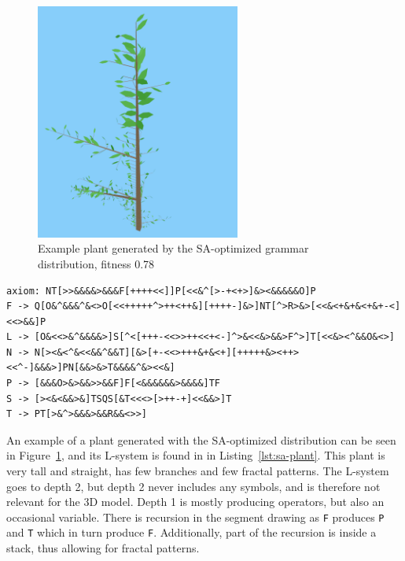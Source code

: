 \begin{figure}
    \centering
    \includegraphics[width=0.6\textwidth]{figures/sa-plant}
    \caption[Example plant generated by the SA-optimized grammar distribution]{Example plant generated by the \gls{SA}-optimized grammar distribution, fitness 0.78}
    \label{fig:sa-plant}
\end{figure}

\begin{lstlisting}[caption=L-system representation of plant in Figure~\ref{fig:sa-plant}, label=lst:sa-plant, float]
axiom: NT[>>&&&&>&&&F[++++<<]]P[<<&^[>-+<+>]&><&&&&&O]P
F -> Q[O&^&&&^&<>O[<<+++++^>++<++&][++++-]&>]NT[^>R>&>[<<&<+&+&<+&+-<]<<>&&]P
L -> [O&<<>&^&&&&>]S[^<[+++-<<>>++<<+<-]^>&<<&>&&>F^>]T[<<&><^&&O&<>]
N -> N[><&<^&<<&&^&&T][&>[+-<<>+++&+&<+][+++++&><++><<^-]&&&>]PN[&&>&>T&&&&^&><<&]
P -> [&&&O>&>&&>>&&F]F[<&&&&&&>&&&&]TF
S -> [><&<&&>&]TSQS[&T<<<>[>++-+]<<&&>]T
T -> PT[>&^>&&&>&&R&&<>>]
\end{lstlisting}

An example of a plant generated with the \gls{SA}-optimized distribution can be seen in Figure~\ref{fig:sa-plant}, and its \gls{L-system} is found in in Listing~\ref{lst:sa-plant}.
This plant is very tall and straight, has few branches and few fractal patterns.
The \gls{L-system} goes to depth 2, but depth 2 never includes any symbols, and is therefore not relevant for the 3D model.
Depth 1 is mostly producing operators, but also an occasional variable.
There is recursion in the segment drawing as \texttt{F} produces \texttt{P} and \texttt{T} which in turn produce \texttt{F}.
Additionally, part of the recursion is inside a stack, thus allowing for fractal patterns.

